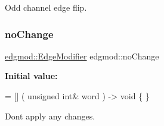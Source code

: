 Odd channel edge flip. 

\mbox{\label{namespaceedgmod_a912724097db2099cc7793a83e42673d7}} 
\subsubsection{\texorpdfstring{no\+Change}{noChange}}
{\footnotesize\ttfamily \hyperlink{namespaceedgmod_abd975beb42f73310619eb134f62d7712}{edgmod\+::\+Edge\+Modifier} edgmod\+::no\+Change}

{\bfseries Initial value\+:}
\begin{DoxyCode}
= [] (
    \textcolor{keywordtype}{unsigned} \textcolor{keywordtype}{int}& word
) -> \textcolor{keywordtype}{void} \{ \}
\end{DoxyCode}


Don\textquotesingle{}t apply any changes. 

